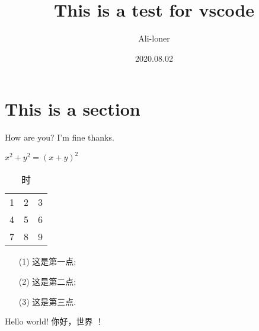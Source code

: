 \documentclass[a4paper]{article}
\title{This is a test for vscode}
\author{Ali-loner}
\date{2020.08.02}
\begin{document}
    \maketitle
\begin{abstract}
    \lipsum[2]
\end{abstract}
\tableofcontents
\section{This is a section}
How are you?
I'm fine thanks.  

$x^2+y^2 = (x+y)^2$
\begin{table}[htbp]
    \centering
    \caption{时}
    \begin{tabular}{ccc}
        1 & 2 & 3 \\
        4 & 5 & 6 \\
        7 & 8 & 9
    \end{tabular}
\end{table}
\begin{enumerate}
    \item[(1)] 这是第一点; 
    \item[(2)] 这是第二点;
    \item[(3)] 这是第三点. 
\end{enumerate}
Hello world! 你好，世界 ！
\end{document}
